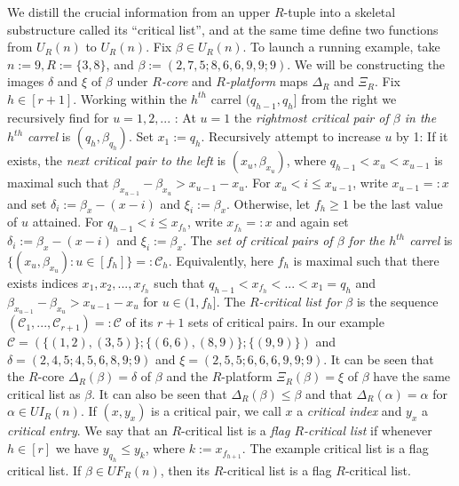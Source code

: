 \documentclass[11pt]{article}
\theoremstyle{definition}
\theoremstyle{remark}
\numberwithin{equation}{section}
\begin{document}
\begin{spacing}{1.35}
We distill the crucial information from an upper $R$-tuple into a skeletal substructure called its ``critical list'', and at the same time define two functions from $U_R(n)$ to $U_R(n)$.  Fix $\beta \in U_R(n)$.  To launch a running example, take $n := 9, R := \{3, 8 \}$, and $\beta := (2,7,5;8,6,6,9,9;9)$.  We will be constructing the images $\delta$ and $\xi$ of $\beta$ under \emph{$R$-core} and \emph{$R$-platform} maps $\Delta_R$ and $\Xi_R$.  Fix $h \in [r+1]$.  Working within the $h^{th}$ carrel $(q_{h-1}, q_h]$ from the right we recursively find for $u = 1, 2, ...$ :  At $u = 1$ the \emph{rightmost critical pair of $\beta$ in the $h^{th}$ carrel} is $(q_h, \beta_{q_h})$.  Set $x_1 := q_h$.  Recursively attempt to increase $u$ by 1:  If it exists, the \emph{next critical pair to the left} is $(x_u, \beta_{x_u})$, where $q_{h-1} < x_u < x_{u-1}$ is maximal such that $\beta_{x_{u-1}} - \beta_{x_u} > x_{u-1} - x_u$.  For $x_u < i \leq x_{u-1}$, write $x_{u-1} =: x$ and set $\delta_i := \beta_x - (x-i)$ and $\xi_i := \beta_x$.  Otherwise, let $f_h \geq 1$ be the last value of $u$ attained.  For $q_{h-1} < i \leq x_{f_h}$, write $x_{f_h} =: x$ and again set $\delta_i := \beta_x - (x-i)$ and $\xi_i := \beta_x$.  The \emph{set of critical pairs of $\beta$ for the $h^{th}$ carrel} is $\{ (x_u, \beta_{x_u}) : u \in [f_h] \} =: \mathcal{C}_h$.  Equivalently, here $f_h$ is maximal such that there exists indices $x_1, x_2, ... , x_{f_h}$ such that $q_{h-1} < x_{f_h} < ... < x_1 = q_h$ and $\beta_{x_{u-1}} - \beta_{x_u} > x_{u-1} - x_u$ for $u \in (1, f_h]$.  The \emph{$R$-critical list for $\beta$} is the sequence $(\mathcal{C}_1, ... , \mathcal{C}_{r+1}) =: \mathcal{C}$ of its $r+1$ sets of critical pairs.  In our example $\mathcal{C} = ( \{ (1,2), (3,5) \}; \{(6,6),(8,9)\}; \{(9,9)\})$ and $\delta = (2,4,5;4,5,6,8,9;9)$ and $\xi = (2,5,5;6,6,6,9,9;9)$.  It can be seen that the $R$-core $\Delta_R(\beta) = \delta$ of $\beta$ and the $R$-platform $\Xi_R(\beta) = \xi$ of $\beta$ have the same critical list as $\beta$.  It can also be seen that $\Delta_R(\beta) \leq \beta$ and that $\Delta_R(\alpha) = \alpha$ for $\alpha \in UI_R(n)$.  If $(x, y_x)$ is a critical pair, we call $x$ a \emph{critical index} and $y_x$ a \emph{critical entry}.  We say that an $R$-critical list is a \emph{flag $R$-critical list} if whenever $h \in [r]$ we have $y_{q_h} \leq y_k$, where $k := x_{f_{h+1}}$.  The example critical list is a flag critical list.  If $\beta \in UF_R(n)$, then its $R$-critical list is a flag $R$-critical list.





\end{spacing}
\end{document}
